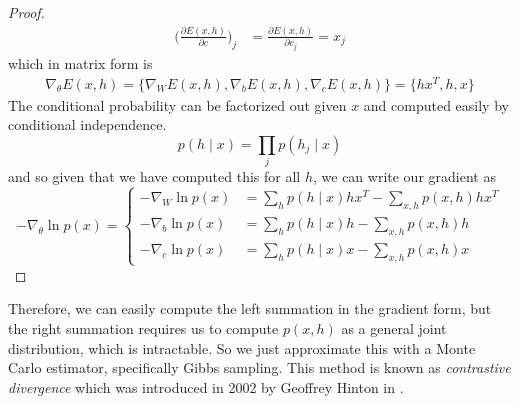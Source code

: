 \documentclass{article}
\begin{document}
\begin{proof}
\begin{align}
        \bigg( \frac{\partial E(x, h)}{\partial c} \bigg)_j & = \frac{\partial E(x, h)}{\partial c_j} = x_j 
      \end{align}  
      which in matrix form is 
      \begin{align}
        \nabla_{\theta} E(x, h) = \{ \nabla_W E(x, h), \nabla_b E(x, h), \nabla_c E(x, h) \} = \{ h x^T, h, x \}
      \end{align}
      The conditional probability can be factorized out given $x$ and computed easily by conditional independence. 
      \begin{equation}
        p(h \mid x) = \prod_j p(h_j \mid x)
      \end{equation}
      and so given that we have computed this for all $h$, we can write our gradient as 
      \begin{equation}
        -\nabla_\theta \ln{p(x)} = \begin{cases}
          - \nabla_W \ln{p(x)} & = \sum_h p(h \mid x) h x^T - \sum_{x, h} p(x, h) h x^T \\
          - \nabla_b \ln{p(x)} & =  \sum_h p(h \mid x) h - \sum_{x, h} p(x, h) h \\
          - \nabla_c \ln{p(x)} & =  \sum_h p(h \mid x) x - \sum_{x, h} p(x, h) x
        \end{cases}
      \end{equation}
    \end{proof} 

    Therefore, we can easily compute the left summation in the gradient form, but the right summation requires us to compute $p(x, h)$ as a general joint distribution, which is intractable. So we just approximate this with a Monte Carlo estimator, specifically Gibbs sampling. This method is known as \textit{contrastive divergence} which was introduced in 2002 by Geoffrey Hinton in \cite{cd}. 
\end{document}

